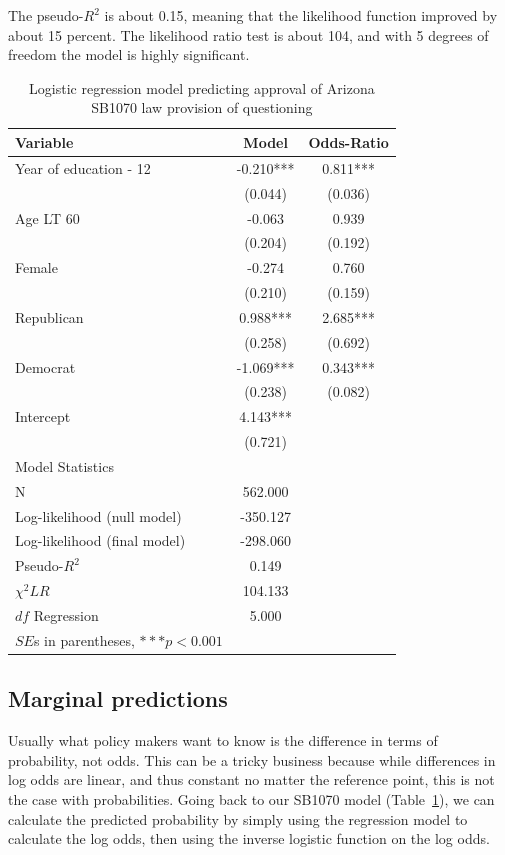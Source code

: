 The pseudo-$R^2$ is about 0.15, meaning that the likelihood function improved by about 15 percent. The likelihood ratio test is about 104, and with 5 degrees of freedom the model is highly significant.


\begin{table}[htbp]\centering
 \caption{Logistic regression model predicting approval of Arizona SB1070 law provision of questioning
\label{tab:sb1070logit}}
\begin{tabular}{lcc}
\hline
Variable      &    Model & Odds-Ratio  \\
\hline
Year of education - 12    &   -0.210***&    0.811***\\
      &   (0.044)  &   (0.036)  \\
Age LT 60    &   -0.063  &    0.939  \\
      &   (0.204)  &   (0.192)  \\
Female   &   -0.274  &    0.760  \\
      &   (0.210)  &   (0.159)  \\
Republican    &    0.988***&    2.685***\\
      &   (0.258)  &   (0.692)  \\
Democrat    &   -1.069***&    0.343***\\
      &   (0.238)  &   (0.082)  \\
Intercept    &    4.143***&   \\
      &   (0.721)  &   \\
\hline
\multicolumn{1}{l}{Model Statistics} \\
\hline
N      &   562.000  \\
Log-likelihood (null model)    &  -350.127  \\
Log-likelihood (final model)     &  -298.060  \\
Pseudo-$R^2$    &    0.149  \\
$\chi^2 LR$    &   104.133  \\
$df$ Regression    &    5.000  \\
\hline
\multicolumn{1}{l}{$SE$s in parentheses, $***p<0.001$} \\
\hline
\end{tabular}
\end{table}

\subsection{Marginal predictions}

Usually what policy makers want to know is the difference in terms of probability, not odds.  This can be a tricky business because while differences in log odds are linear, and thus constant no matter the reference point, this is not the case with probabilities. Going back to our SB1070 model (Table~\ref{tab:sb1070logit}), we can calculate the predicted probability by simply using the regression model to calculate the log odds, then using the inverse logistic function on the log odds.

